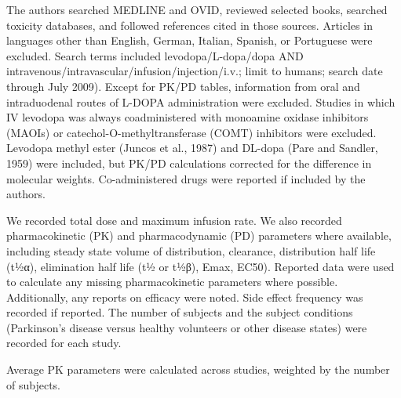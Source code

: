 The authors searched MEDLINE and OVID, reviewed selected books, searched toxicity databases, and followed references cited in those sources. Articles in languages other than English, German, Italian, Spanish, or Portuguese were excluded. Search terms included levodopa/L-dopa/dopa AND intravenous/intravascular/infusion/injection/i.v.; limit to humans; search date through July 2009).  Except for PK/PD tables, information from oral and intraduodenal routes of L-DOPA administration were excluded.  Studies in which IV levodopa was always coadministered with monoamine oxidase inhibitors (MAOIs) or catechol-O-methyltransferase (COMT) inhibitors were excluded.  Levodopa methyl ester (Juncos et al., 1987) and DL-dopa (Pare and Sandler, 1959) were included, but PK/PD calculations corrected for the difference in molecular weights.  Co-administered drugs were reported if included by the authors.

We recorded total dose and maximum infusion rate.  We also recorded pharmacokinetic (PK) and pharmacodynamic (PD) parameters where available, including steady state volume of distribution, clearance, distribution half life (t½α), elimination half life (t½ or t½β), Emax, EC50).   Reported data were used to calculate any missing pharmacokinetic parameters where possible.  Additionally, any reports on efficacy were noted.  Side effect frequency was recorded if reported. The number of subjects and the subject conditions (Parkinson’s disease versus healthy volunteers or other disease states) were recorded for each study. 

Average PK parameters were calculated across studies, weighted by the number of subjects.